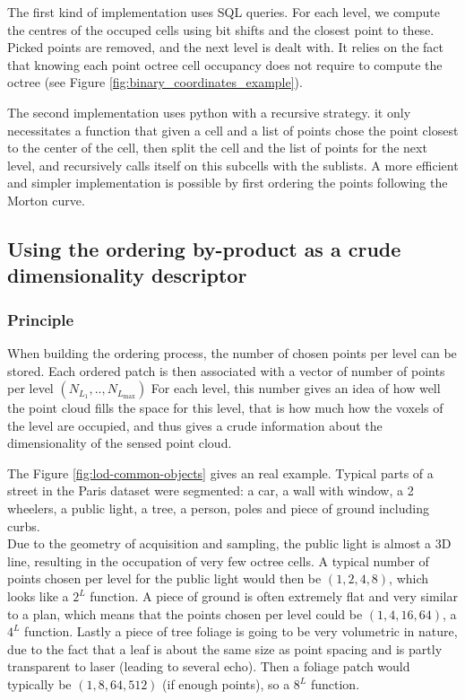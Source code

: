 			The first kind of implementation uses SQL queries. For each level, we compute the centres of the occuped cells using bit shifts and the closest point to these. Picked points are removed, and the next level is dealt with. It relies on the fact that knowing each point octree cell occupancy does not require to compute the octree (see Figure \ref{fig:binary_coordinates_example}).
			
			The second implementation uses python with a recursive strategy. it only necessitates a function that given a cell and a list of points chose the point closest to the center of the cell, then split the cell and the list of points for the next level, and recursively calls itself on this subcells with the sublists.
			A more efficient and simpler implementation is possible by first ordering the points following the Morton curve.
			  
				
	\subsection{Using the ordering by-product as a crude dimensionality descriptor}
	
	
		\label{method.dimdescriptor}
		\subsubsection{Principle}
			When building the ordering process, the number of chosen points per level can be stored. 
			Each ordered patch is then associated with a vector of number of points per level $(N_{L_{1}},..,N_{L_{\text{max}}})$
			For each level, this number gives an idea of how well the point cloud fills the space for this level, that is how much how the voxels of the level are occupied, and thus gives a crude information about the dimensionality of the sensed point cloud.
			
			
			
			The Figure \ref{fig:lod-common-objects} gives an real example. Typical parts of a street in the Paris dataset were segmented: a car, a wall with window, a 2 wheelers, a public light, a tree, a person, poles and piece of ground including curbs.
			\\
			Due to the geometry of acquisition and sampling, the public light is almost a 3D line, resulting in the occupation of very few octree cells.
			A typical number of points chosen per level  for the public light would then be $(1,2,4,8)$, which looks like a $2^L$ function.
			A piece of ground is often extremely flat and very similar to a plan, which means that the points chosen per level could be $(1,4,16,64)$, a $4^L$ function.
			Lastly a piece of tree foliage is going to be very volumetric in nature, due to the fact that a leaf is about the same size as point spacing and is partly transparent to laser (leading to several echo).
			Then a foliage patch would typically be $(1,8,64,512)$ (if enough points), so a $8^L$ function.
			
